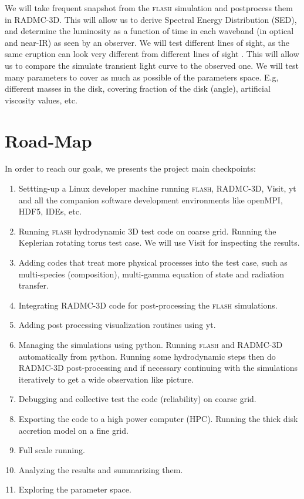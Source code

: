 \documentclass[a4paper,modern]{aastex62}
\begin{document}
We will take frequent snapshot from the \textsc{flash} simulation and postprocess them in RADMC-3D.
This will allow us to derive Spectral Energy Distribution (SED), and determine the luminosity as a function of time in each waveband (in optical and near-IR) as seen by an observer.
We will test different lines of sight, as the same eruption can look very different from different lines of sight \cite{2017MNRAS.467.3299K}.
This will allow us to compare the simulate transient light curve to the observed one.
We will test many parameters to cover as much as possible of the parameters space. E.g, different masses in the disk, covering fraction of the disk (angle), artificial viscosity values, etc.

\section{Road-Map}

In order to reach our goals, we presents the project main checkpoints:
\begin{enumerate}
\item Settting-up a Linux developer machine running \textsc{flash}, RADMC-3D, Visit, yt and all the companion software development environments like openMPI, HDF5, IDEs, etc.
\item Running \textsc{flash} hydrodynamic 3D test code on coarse grid. Running the Keplerian rotating torus test case. We will use Visit for inspecting the results.
\item Adding codes that treat more physical processes into the test case, such as multi-species (composition), multi-gamma equation of state and radiation transfer.
\item Integrating RADMC-3D code for post-processing the  \textsc{flash} simulations.
\item Adding post processing visualization routines using yt.
\item Managing the simulations using python. Running \textsc{flash} and RADMC-3D automatically from python. Running some hydrodynamic steps then do RADMC-3D post-processing and if necessary continuing with the simulations iteratively to get a wide observation like picture.
\item Debugging and collective test the code (reliability) on coarse grid.
\item Exporting the code to a high power computer (HPC). Running the thick disk accretion model on a fine grid.
\item Full scale running.
\item Analyzing the results and summarizing them.
\item Exploring the parameter space.
\end{enumerate}
\end{document}
